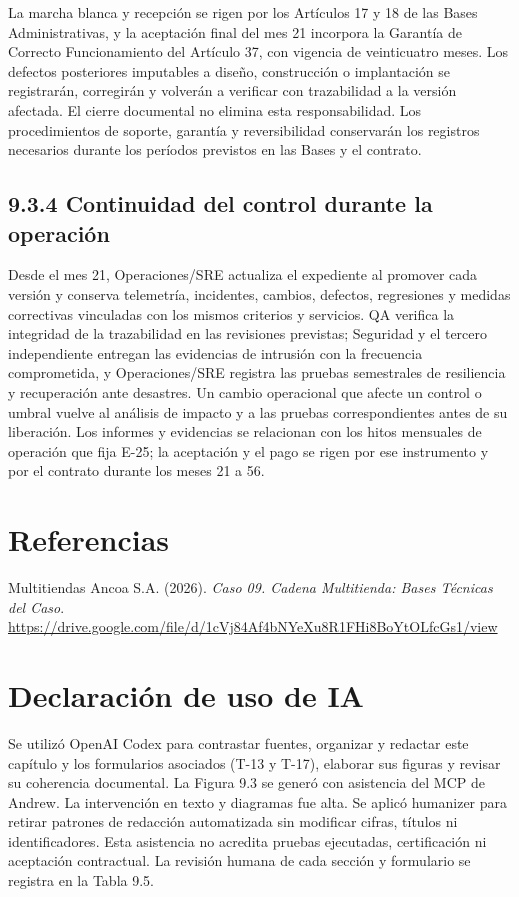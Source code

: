 \documentclass[11pt]{article}
\begin{document}
La marcha blanca y recepción se rigen por los Artículos 17 y 18 de las Bases Administrativas, y la aceptación final del mes 21 incorpora la Garantía de Correcto Funcionamiento del Artículo 37, con vigencia de veinticuatro meses. Los defectos posteriores imputables a diseño, construcción o implantación se registrarán, corregirán y volverán a verificar con trazabilidad a la versión afectada. El cierre documental no elimina esta responsabilidad. Los procedimientos de soporte, garantía y reversibilidad conservarán los registros necesarios durante los períodos previstos en las Bases y el contrato.

\subsection{9.3.4 Continuidad del control durante la operación}

Desde el mes 21, Operaciones/SRE actualiza el expediente al promover cada versión y conserva telemetría, incidentes, cambios, defectos, regresiones y medidas correctivas vinculadas con los mismos criterios y servicios. QA verifica la integridad de la trazabilidad en las revisiones previstas; Seguridad y el tercero independiente entregan las evidencias de intrusión con la frecuencia comprometida, y Operaciones/SRE registra las pruebas semestrales de resiliencia y recuperación ante desastres. Un cambio operacional que afecte un control o umbral vuelve al análisis de impacto y a las pruebas correspondientes antes de su liberación. Los informes y evidencias se relacionan con los hitos mensuales de operación que fija E-25; la aceptación y el pago se rigen por ese instrumento y por el contrato durante los meses 21 a 56.

\section*{Referencias}

Multitiendas Ancoa S.A. (2026). \textit{Caso 09. Cadena Multitienda: Bases Técnicas del Caso}. \url{https://drive.google.com/file/d/1cVj84Af4bNYeXu8R1FHi8BoYtOLfcGs1/view}

\section*{Declaración de uso de IA}

Se utilizó OpenAI Codex para contrastar fuentes, organizar y redactar este capítulo y los formularios asociados (T-13 y T-17), elaborar sus figuras y revisar su coherencia documental. La Figura 9.3 se generó con asistencia del MCP de Andrew. La intervención en texto y diagramas fue alta. Se aplicó humanizer para retirar patrones de redacción automatizada sin modificar cifras, títulos ni identificadores. Esta asistencia no acredita pruebas ejecutadas, certificación ni aceptación contractual. La revisión humana de cada sección y formulario se registra en la Tabla 9.5.
\end{document}
